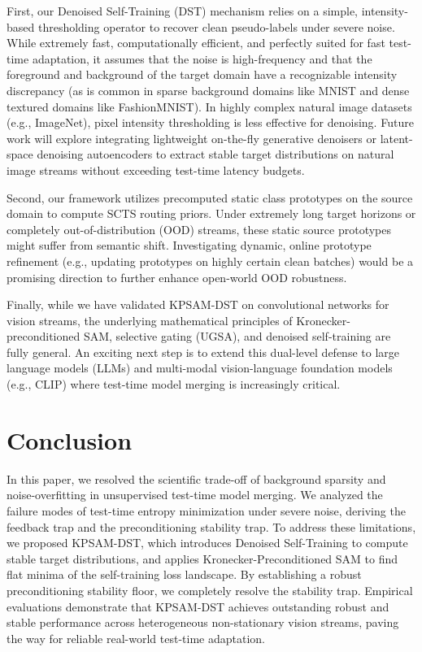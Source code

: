 \documentclass{article}
\theoremstyle{plain}
\theoremstyle{definition}
\theoremstyle{remark}
\begin{document}
First, our Denoised Self-Training (DST) mechanism relies on a simple, intensity-based thresholding operator to recover clean pseudo-labels under severe noise. While extremely fast, computationally efficient, and perfectly suited for fast test-time adaptation, it assumes that the noise is high-frequency and that the foreground and background of the target domain have a recognizable intensity discrepancy (as is common in sparse background domains like MNIST and dense textured domains like FashionMNIST). In highly complex natural image datasets (e.g., ImageNet), pixel intensity thresholding is less effective for denoising. Future work will explore integrating lightweight on-the-fly generative denoisers or latent-space denoising autoencoders to extract stable target distributions on natural image streams without exceeding test-time latency budgets.

Second, our framework utilizes precomputed static class prototypes on the source domain to compute SCTS routing priors. Under extremely long target horizons or completely out-of-distribution (OOD) streams, these static source prototypes might suffer from semantic shift. Investigating dynamic, online prototype refinement (e.g., updating prototypes on highly certain clean batches) would be a promising direction to further enhance open-world OOD robustness.

Finally, while we have validated KPSAM-DST on convolutional networks for vision streams, the underlying mathematical principles of Kronecker-preconditioned SAM, selective gating (UGSA), and denoised self-training are fully general. An exciting next step is to extend this dual-level defense to large language models (LLMs) and multi-modal vision-language foundation models (e.g., CLIP) where test-time model merging is increasingly critical.

\section{Conclusion}
\label{sec:conclusion}
In this paper, we resolved the scientific trade-off of background sparsity and noise-overfitting in unsupervised test-time model merging. We analyzed the failure modes of test-time entropy minimization under severe noise, deriving the feedback trap and the preconditioning stability trap. To address these limitations, we proposed KPSAM-DST, which introduces Denoised Self-Training to compute stable target distributions, and applies Kronecker-Preconditioned SAM to find flat minima of the self-training loss landscape. By establishing a robust preconditioning stability floor, we completely resolve the stability trap. Empirical evaluations demonstrate that KPSAM-DST achieves outstanding robust and stable performance across heterogeneous non-stationary vision streams, paving the way for reliable real-world test-time adaptation.



\end{document}
